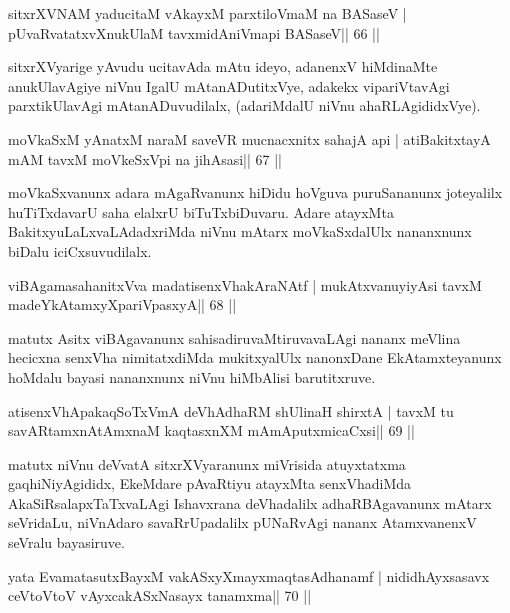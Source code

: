 \begin{shl}
sitxrXVNAM yaducitaM vAkayxM parxtiloVmaM na BASaseV |
pUvaRvatatxvXnukUlaM tavxmidAniVmapi BASaseV\hfill || 66 ||
\end{shl}

\begin{artha}
sitxrXVyarige yAvudu ucitavAda mAtu ideyo, adanenxV hiMdinaMte anukUlavAgiye niVnu IgalU mAtanADutitxVye, adakekx vipariVtavAgi parxtikUlavAgi mAtanADuvudilalx, (adariMdalU niVnu ahaRLAgididxVye).
\end{artha}

\begin{shl}
moVkaSxM yAnatxM naraM saveVR mucnacxnitx sahajA api |
atiBakitxtayA mAM tavxM moVkeSxV\s pi na jihAsasi\hfill || 67 ||
\end{shl}

\begin{artha}
moVkaSxvanunx adara mAgaRvanunx hiDidu hoVguva puruSananunx joteyalilx huTiTxdavarU saha elalxrU biTuTxbiDuvaru. Adare atayxMta BakitxyuLaLxvaLAdadxriMda niVnu mAtarx moVkaSxdalUlx nananxnunx biDalu iciCxsuvudilalx.
\end{artha}

\begin{shl}
viBAgamasahanitxVva madatisenxVhakAraNAtf |
mukAtxvanuyiyAsi tavxM madeYkAtamxyXpariVpasxyA\hfill || 68 ||
\end{shl}

\begin{artha}
matutx Asitx viBAgavanunx sahisadiruvaMtiruvavaLAgi nananx meVlina hecicxna senxVha nimitatxdiMda mukitxyalUlx nanonxDane EkAtamxteyanunx hoMdalu bayasi nananxnunx niVnu hiMbAlisi barutitxruve.
\end{artha}

\begin{shl}
atisenxVhA\s pakaqSoTxVmA deVhAdhaRM shUlinaH shirxtA |
tavxM tu savARtamxnA\s\s tAmxnaM kaqtasxnXM mAmAputxmicaCxsi\hfill || 69 ||
\end{shl}

\begin{artha}
matutx niVnu deVvatA sitxrXVyaranunx miVrisida atuyxtatxma gaqhiNiyAgididx, EkeMdare pAvaRtiyu atayxMta senxVhadiMda AkaSiRsalapxTaTxvaLAgi Ishavxrana deVhadalilx adhaRBAgavanunx mAtarx seVridaLu, niVnAdaro savaRrUpadalilx pUNaRvAgi nananx AtamxvanenxV seVralu bayasiruve.
\end{artha}

\begin{shl}
yata EvamatasutxBayxM vakASxyXmayxmaqtasAdhanamf |
nididhAyxsasavx ceVtoV\s toV vAyxcakASxNasayx tanamxma\hfill || 70 ||
\end{shl}

